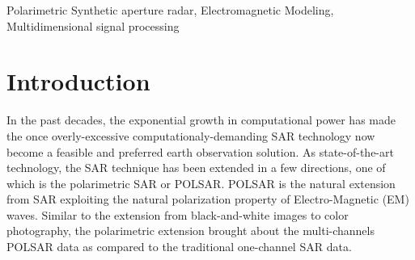 \documentclass[journal]{IEEEtran}
\begin{document}
\begin{abstract}
\end{abstract}

\begin{IEEEkeywords}
Polarimetric Synthetic aperture radar, Electromagnetic Modeling, Multidimensional signal processing  
\end{IEEEkeywords}

\IEEEpeerreviewmaketitle

\section{Introduction}

In the past decades, the exponential growth in computational power has made the once overly-excessive computationaly-demanding SAR technology now become a feasible and preferred earth observation solution.
As state-of-the-art technology, the SAR technique has been extended in a few directions, one of which is the polarimetric SAR or POLSAR.
POLSAR is the natural extension from SAR exploiting the natural polarization property of Electro-Magnetic (EM) waves.
Similar to the extension from black-and-white images to color photography, the polarimetric extension brought about the multi-channels POLSAR data as compared to the traditional one-channel SAR data.
\end{document}

